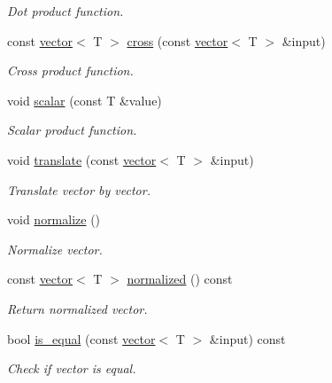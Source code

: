 \begin{DoxyCompactItemize}
\begin{DoxyCompactList}\small\item\em Dot product function. \end{DoxyCompactList}\item 
const \hyperlink{classddd_1_1vector}{vector}$<$ T $>$ \hyperlink{classddd_1_1vector_a27ac4cb7a469642d497cfe070935ab4b}{cross} (const \hyperlink{classddd_1_1vector}{vector}$<$ T $>$ \&input)
\begin{DoxyCompactList}\small\item\em Cross product function. \end{DoxyCompactList}\item 
void \hyperlink{classddd_1_1vector_af54b7b7822b48b3648e147eed92556cb}{scalar} (const T \&value)
\begin{DoxyCompactList}\small\item\em Scalar product function. \end{DoxyCompactList}\item 
void \hyperlink{classddd_1_1vector_a5d9764ea0d9e7342d967199070b1b744}{translate} (const \hyperlink{classddd_1_1vector}{vector}$<$ T $>$ \&input)
\begin{DoxyCompactList}\small\item\em Translate vector by vector. \end{DoxyCompactList}\item 
\mbox{\label{classddd_1_1vector_aeff69a088496a7c9295b30b1c928df70}} 
void \hyperlink{classddd_1_1vector_aeff69a088496a7c9295b30b1c928df70}{normalize} ()
\begin{DoxyCompactList}\small\item\em Normalize vector. \end{DoxyCompactList}\item 
\mbox{\label{classddd_1_1vector_a40b593b08a2dd6af92c5c07bb9faa463}} 
const \hyperlink{classddd_1_1vector}{vector}$<$ T $>$ \hyperlink{classddd_1_1vector_a40b593b08a2dd6af92c5c07bb9faa463}{normalized} () const
\begin{DoxyCompactList}\small\item\em Return normalized vector. \end{DoxyCompactList}\item 
bool \hyperlink{classddd_1_1vector_a860847a7c7c93e52b4a83af722eb60f7}{is\+\_\+equal} (const \hyperlink{classddd_1_1vector}{vector}$<$ T $>$ \&input) const
\begin{DoxyCompactList}\small\item\em Check if vector is equal. \end{DoxyCompactList}\item 

\end{DoxyCompactItemize}
